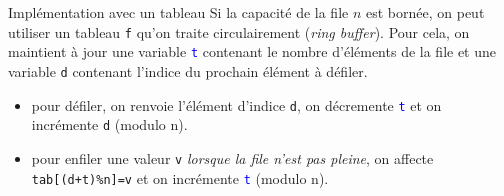 \documentclass[10pt]{beamer}
\begin{document}
\begin{frame}[fragile]{\Ctitle}{\stitle}
	\begin{block}{Implémentation avec un tableau}
		Si la capacité de la file  $n$ est bornée, on peut utiliser  un tableau {\tt f} qu'on traite circulairement (\textit{ring buffer}). Pour cela, on maintient à jour une variable \textcolor{blue}{\tt t} contenant le nombre d'éléments de la file et une variable \textcolor{OliveGreen}{\tt d} contenant l'indice du prochain élément à défiler.
		\begin{itemize}
			\item<2-> pour défiler, on renvoie l'élément d'indice \textcolor{OliveGreen}{\tt d}, on décremente \textcolor{blue}{\tt t} et on incrémente \textcolor{OliveGreen}{\tt d} (modulo n).
			\item<3-> pour enfiler une valeur {\tt v} \textit{lorsque la file n'est pas pleine}, on affecte {\tt tab[(d+t)\%n]=v} et on incrémente \textcolor{blue}{\tt t} (modulo n).
		\end{itemize}

	\end{block}
\end{frame}
\end{document}
